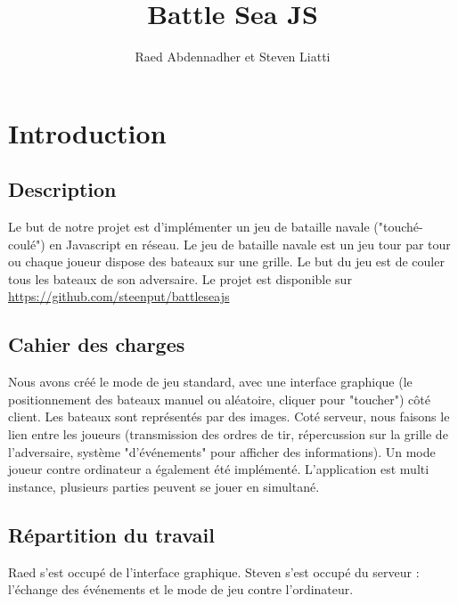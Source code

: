 \documentclass[a4paper, 11pt]{article}
\begin{document}
\title{Battle Sea JS} 
\author{Raed Abdennadher et Steven Liatti} 
\maketitle

\section{Introduction}
\subsection{Description}
Le but de notre projet est d’implémenter un jeu de bataille navale ("touché-coulé") en Javascript en réseau. Le jeu de bataille navale est un jeu tour par tour ou chaque joueur dispose des bateaux sur une grille. Le but du jeu est de couler tous les bateaux de son adversaire. Le projet est disponible sur \url{https://github.com/steenput/battleseajs}

\subsection{Cahier des charges}
Nous avons créé le mode de jeu standard, avec une interface graphique (le positionnement des bateaux manuel ou aléatoire, cliquer pour "toucher") côté client. Les bateaux sont représentés par des images. Coté serveur, nous faisons le lien entre les joueurs (transmission des ordres de tir, répercussion sur la grille de l’adversaire, système "d'événements" pour afficher des informations). Un mode joueur contre ordinateur a également été implémenté. L'application est multi instance, plusieurs parties peuvent se jouer en simultané.

\subsection{Répartition du travail}
Raed s'est occupé de l'interface graphique. Steven s'est occupé du serveur : l'échange des événements et le mode de jeu contre l'ordinateur.
\end{document}

